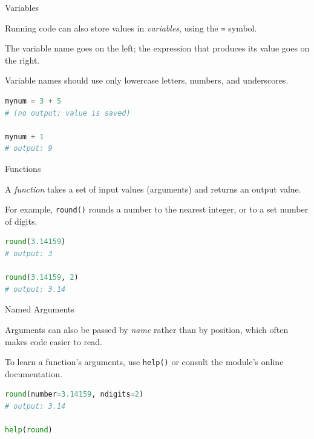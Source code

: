 \documentclass[8pt,aspectratio=169]{beamer}
\begin{document}
\begin{frame}[fragile]{Variables}
\begin{splitcode}{%

Running code can also store values in \textit{variables}, using the \texttt{=} symbol.

The variable name goes on the left; the expression that produces its value goes on the right.

Variable names should use only lowercase letters, numbers, and underscores.

}
\begin{lstlisting}[language=Python]
mynum = 3 + 5
# (no output; value is saved)

mynum + 1
# output: 9
\end{lstlisting}
\end{splitcode}
\end{frame}

\begin{frame}[fragile]{Functions}
\begin{splitcode}{%

A \textit{function} takes a set of input values (arguments) and returns an output value.

For example, \texttt{round()} rounds a number to the nearest integer, or to a set number of digits.

}
\begin{lstlisting}[language=Python]
round(3.14159)
# output: 3

round(3.14159, 2)
# output: 3.14
\end{lstlisting}
\end{splitcode}
\end{frame}

\begin{frame}[fragile]{Named Arguments}
\begin{splitcode}{%

Arguments can also be passed by \textit{name} rather than by position, which often makes code easier to read.

To learn a function's arguments, use \texttt{help()} or consult the module's online documentation.

}
\begin{lstlisting}[language=Python]
round(number=3.14159, ndigits=2)
# output: 3.14

help(round)
\end{lstlisting}
\end{splitcode}
\end{frame}
\end{document}
